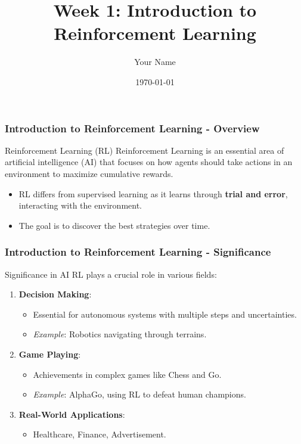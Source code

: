 \documentclass{beamer}
\title{Week 1: Introduction to Reinforcement Learning}
\author{Your Name}
\institute{Your Institution}
\date{\today}
\begin{document}
\frame{\titlepage}

\begin{frame}[fragile]
    \frametitle{Introduction to Reinforcement Learning - Overview}
    
    \begin{block}{Reinforcement Learning (RL)}
        Reinforcement Learning is an essential area of artificial intelligence (AI) that focuses on how agents should take actions in an environment to maximize cumulative rewards. 
    \end{block}
    
    \begin{itemize}
        \item RL differs from supervised learning as it learns through \textbf{trial and error}, interacting with the environment.
        \item The goal is to discover the best strategies over time.
    \end{itemize}

\end{frame}

\begin{frame}[fragile]
    \frametitle{Introduction to Reinforcement Learning - Significance}
    
    \begin{block}{Significance in AI}
        RL plays a crucial role in various fields:
    \end{block}
    
    \begin{enumerate}
        \item \textbf{Decision Making}:
            \begin{itemize}
                \item Essential for autonomous systems with multiple steps and uncertainties.
                \item \textit{Example}: Robotics navigating through terrains.
            \end{itemize}
        \item \textbf{Game Playing}:
            \begin{itemize}
                \item Achievements in complex games like Chess and Go.
                \item \textit{Example}: AlphaGo, using RL to defeat human champions.
            \end{itemize}
        \item \textbf{Real-World Applications}:
            \begin{itemize}
                \item Healthcare, Finance, Advertisement.
            \end{itemize}
    \end{enumerate}

\end{frame}
\end{document}
